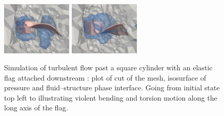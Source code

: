 \begin{figure}
{    \includegraphics[width=0.3\textwidth]{chapters/hoffman-1/png/cube550.png}
    \includegraphics[width=0.3\textwidth]{chapters/hoffman-1/png/cube649.png}\\
  }
  \caption{Simulation of turbulent flow past a square cylinder with an
    elastic flag attached downstream \citep{HoffmanJanssonStockli2011}: plot
    of cut of the mesh, isosurface of pressure and fluid--structure phase
    interface. Going from initial state top left to illustrating violent
    bending and torsion motion along the long axis of the flag.}
  \label{hoffman-1:fig:flag}
\end{figure}
